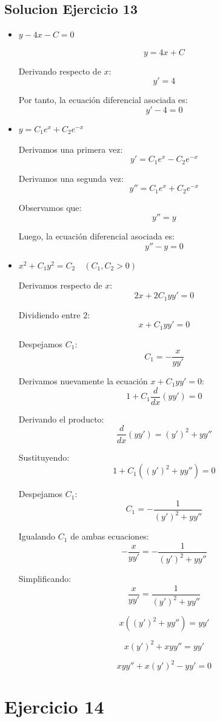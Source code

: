 \documentclass[12pt]{article}
\begin{document}
\subsection*{Solucion Ejercicio 13}

\begin{itemize}
\item[\textbf{a)}] $y - 4x - C = 0$

\[
y = 4x + C
\]

Derivando respecto de $x$:
\[
y' = 4
\]

Por tanto, la ecuación diferencial asociada es:
\[
\boxed{y' - 4 = 0}
\]

\item[\textbf{b)}] $y = C_1 e^x + C_2 e^{-x}$

Derivamos una primera vez:
\[
y' = C_1 e^x - C_2 e^{-x}
\]

Derivamos una segunda vez:
\[
y'' = C_1 e^x + C_2 e^{-x}
\]

Observamos que:
\[
y'' = y
\]

Luego, la ecuación diferencial asociada es:
\[
\boxed{y'' - y = 0}
\]

\item[\textbf{c)}] $x^2 + C_1 y^2 = C_2 \quad (C_1, C_2 > 0)$

Derivamos respecto de $x$:
\[
2x + 2C_1 y y' = 0
\]

Dividiendo entre 2:
\[
x + C_1 y y' = 0
\]

Despejamos $C_1$:
\[
C_1 = -\frac{x}{y y'}
\tag{1}
\]

Derivamos nuevamente la ecuación $x + C_1 y y' = 0$:
\[
1 + C_1 \frac{d}{dx}(y y') = 0
\]

Derivando el producto:
\[
\frac{d}{dx}(y y') = (y')^2 + y y''
\]

Sustituyendo:
\[
1 + C_1\left((y')^2 + y y''\right) = 0
\]

Despejamos $C_1$:
\[
C_1 = -\frac{1}{(y')^2 + y y''}
\tag{2}
\]

Igualando $C_1$ de ambas ecuaciones:
\[
-\frac{x}{y y'} = -\frac{1}{(y')^2 + y y''}
\]

Simplificando:
\[
\frac{x}{y y'} = \frac{1}{(y')^2 + y y''}
\]

\[
x\left((y')^2 + y y''\right) = y y'
\]

\[
x (y')^2 + x y y'' = y y'
\]

\[
\boxed{x y y'' + x (y')^2 - y y' = 0}
\]

\end{itemize}

\section*{Ejercicio 14}
\end{document}
